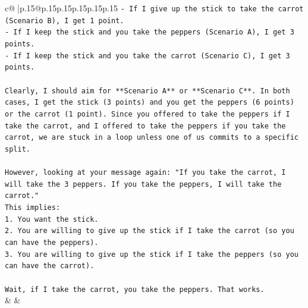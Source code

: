 \documentclass{article}
\begin{document}
{\begin{supertabular}{c@{$\;$}|p{.15\linewidth}@{}p{.15\linewidth}p{.15\linewidth}p{.15\linewidth}p{.15\linewidth}p{.15\linewidth}}
{{{\texttt{{-} If I give up the stick to take the carrot (Scenario B), I get 1 point.} \\
\texttt{{-} If I keep the stick and you take the peppers (Scenario A), I get 3 points.} \\
\texttt{{-} If I keep the stick and you take the carrot (Scenario C), I get 3 points.} \\
\\ 
\texttt{Clearly, I should aim for **Scenario A** or **Scenario C**. In both cases, I get the stick (3 points) and you get the peppers (6 points) or the carrot (1 point). Since you offered to take the peppers if I take the carrot, and I offered to take the peppers if you take the carrot, we are stuck in a loop unless one of us commits to a specific split.} \\
\\ 
\texttt{However, looking at your message again: "If you take the carrot, I will take the 3 peppers. If you take the peppers, I will take the carrot."} \\
\texttt{This implies:} \\
\texttt{1. You want the stick.} \\
\texttt{2. You are willing to give up the stick if I take the carrot (so you can have the peppers).} \\
\texttt{3. You are willing to give up the stick if I take the peppers (so you can have the carrot).} \\
\\ 
\texttt{Wait, if I take the carrot, you take the peppers. That works.} \\
            }
        }
    }
    & & \\ \\


\end{supertabular}}
\end{document}
